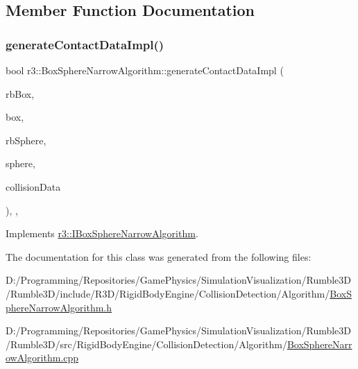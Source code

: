 \subsection{Member Function Documentation}
\mbox{\label{classr3_1_1_box_sphere_narrow_algorithm_a2fc345fdec27e85f0e569afa0d500865}} 
\subsubsection{\texorpdfstring{generate\+Contact\+Data\+Impl()}{generateContactDataImpl()}}
{\footnotesize\ttfamily bool r3\+::\+Box\+Sphere\+Narrow\+Algorithm\+::generate\+Contact\+Data\+Impl (\begin{DoxyParamCaption}\item[{\mbox{\hyperlink{classr3_1_1_rigid_body}{Rigid\+Body}} $\ast$}]{rb\+Box,  }\item[{\mbox{\hyperlink{classr3_1_1_collision_box}{Collision\+Box}} $\ast$}]{box,  }\item[{\mbox{\hyperlink{classr3_1_1_rigid_body}{Rigid\+Body}} $\ast$}]{rb\+Sphere,  }\item[{\mbox{\hyperlink{classr3_1_1_collision_sphere}{Collision\+Sphere}} $\ast$}]{sphere,  }\item[{\mbox{\hyperlink{classr3_1_1_collision_data}{Collision\+Data}} \&}]{collision\+Data }\end{DoxyParamCaption})\hspace{0.3cm}{\ttfamily [override]}, {\ttfamily [protected]}, {\ttfamily [virtual]}}



Implements \mbox{\hyperlink{classr3_1_1_i_box_sphere_narrow_algorithm_af28bcda3eb527a6ee48a3b624e5d47e0}{r3\+::\+I\+Box\+Sphere\+Narrow\+Algorithm}}.



The documentation for this class was generated from the following files\+:\begin{DoxyCompactItemize}
\item 
D\+:/\+Programming/\+Repositories/\+Game\+Physics/\+Simulation\+Visualization/\+Rumble3\+D/\+Rumble3\+D/include/\+R3\+D/\+Rigid\+Body\+Engine/\+Collision\+Detection/\+Algorithm/\mbox{\hyperlink{_box_sphere_narrow_algorithm_8h}{Box\+Sphere\+Narrow\+Algorithm.\+h}}\item 
D\+:/\+Programming/\+Repositories/\+Game\+Physics/\+Simulation\+Visualization/\+Rumble3\+D/\+Rumble3\+D/src/\+Rigid\+Body\+Engine/\+Collision\+Detection/\+Algorithm/\mbox{\hyperlink{_box_sphere_narrow_algorithm_8cpp}{Box\+Sphere\+Narrow\+Algorithm.\+cpp}}\end{DoxyCompactItemize}
